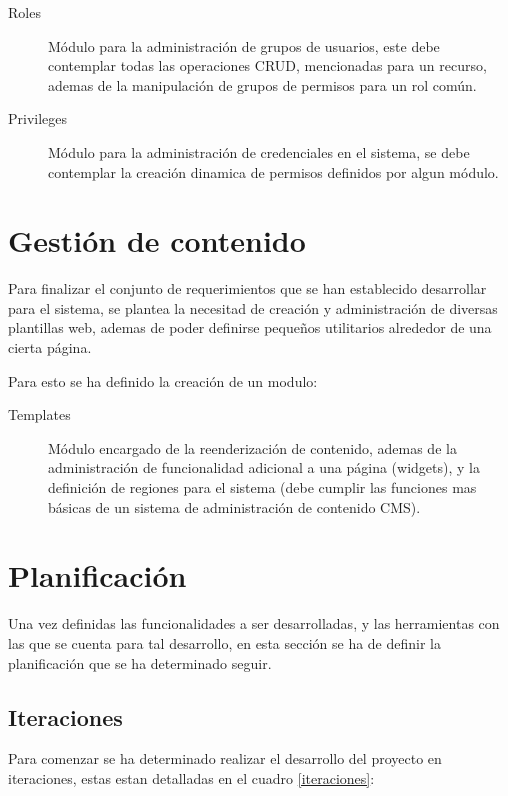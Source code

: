 \begin{description}
\item [Roles] Módulo para la administración de grupos de usuarios, este debe
contemplar todas las operaciones CRUD, mencionadas para un recurso, ademas de la
manipulación de grupos de permisos para un rol común.
\item [Privileges] Módulo para la administración de credenciales en el sistema,
se debe contemplar la creación dinamica de permisos definidos por algun módulo.
\end{description}


\section{Gestión de contenido}

Para finalizar el conjunto de requerimientos que se han establecido desarrollar
para el sistema, se plantea la necesitad de creación y administración de
diversas plantillas web, ademas de poder definirse pequeños utilitarios
alrededor de una cierta página.

Para esto se ha definido la creación de un modulo:

\begin{description}
\item [Templates] Módulo encargado de la reenderización de contenido, ademas de
la administración de funcionalidad adicional a una página (widgets), y la
definición de regiones para el sistema (debe cumplir las funciones mas básicas
de un sistema de administración de contenido CMS).
\end{description}

\section{Planificación}

Una vez definidas las funcionalidades a ser desarrolladas, y las herramientas
con las que se cuenta para tal desarrollo, en esta sección se ha de definir la
planificación que se ha determinado seguir.

\subsection{Iteraciones}

Para comenzar se ha determinado realizar el desarrollo del proyecto en
iteraciones, estas estan detalladas en el cuadro \ref{iteraciones}:

